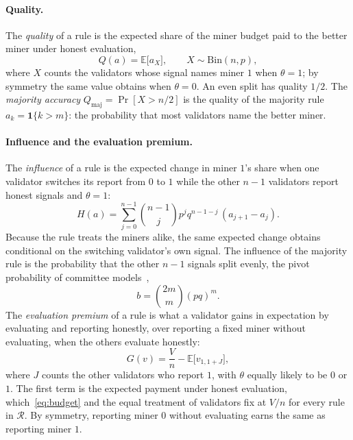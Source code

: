 \documentclass[sigconf,anonymous,review]{acmart}
\numberwithin{equation}{section}
\newcommand{\E}{\mathbb{E}}
\newcommand{\Qmaj}{Q_{\mathrm{maj}}}
\newcommand{\Rset}{\mathcal{R}}
\newcommand{\Bin}{\mathrm{Bin}}
\newcommand{\one}{\mathbf{1}}
\begin{document}
\paragraph{Quality.} The \emph{quality} of a rule is the expected share of the
miner budget paid to the better miner under honest evaluation,
\begin{equation}\label{eq:quality}
Q(a)=\E\bigl[a_X\bigr],\qquad X\sim\Bin(n,p),
\end{equation}
where $X$ counts the validators whose signal names miner $1$ when $\theta=1$; by
symmetry the same value obtains when $\theta=0$. An even split has quality
$1/2$. The \emph{majority accuracy} $\Qmaj=\Pr[X>n/2]$ is the quality of the
majority rule $a_k=\one\{k>m\}$: the probability that most validators name the
better miner.

\paragraph{Influence and the evaluation premium.} The \emph{influence} of a
rule is the expected change in miner $1$'s share when one validator switches
its report from $0$ to $1$ while the other $n-1$ validators report honest
signals and $\theta=1$:
\begin{equation}\label{eq:influence}
H(a)=\sum_{j=0}^{n-1}\binom{n-1}{j}p^jq^{n-1-j}\,(a_{j+1}-a_j).
\end{equation}
Because the rule treats the miners alike, the same expected change obtains
conditional on the switching validator's own signal. The influence of the
majority rule is the probability that the other $n-1$ signals split evenly, the
pivot probability of committee
models~\cite{austensmith1996information,persico2004committee},
\begin{equation}\label{eq:pivot}
b=\binom{2m}{m}(pq)^m.
\end{equation}
The \emph{evaluation premium} of a rule is what a validator gains in
expectation by evaluating and reporting honestly, over reporting a fixed miner
without evaluating, when the others evaluate honestly:
\begin{equation}\label{eq:premium}
G(v)=\frac Vn-\E\bigl[v_{1,1+J}\bigr],
\end{equation}
where $J$ counts the other validators who report $1$, with $\theta$ equally
likely to be $0$ or $1$. The first term is the expected payment under honest
evaluation, which~\eqref{eq:budget} and the equal treatment of validators fix at
$V/n$ for every rule in $\Rset$. By symmetry, reporting miner $0$ without
evaluating earns the same as reporting miner $1$.
\end{document}
